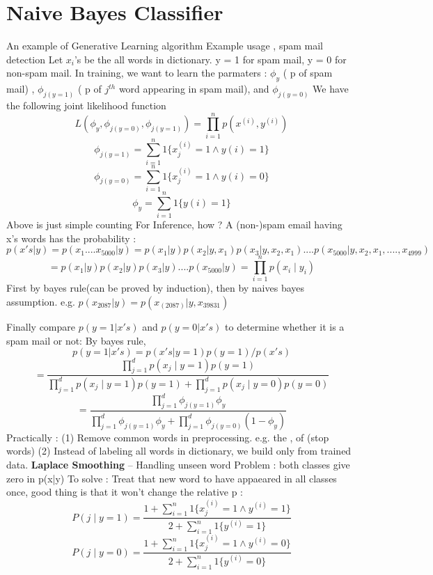 \documentclass{article}
\begin{document}
\section{Naive Bayes Classifier}
An example of Generative Learning algorithm Example usage , spam mail detection\newline
Let \(x_i\)'s be the all words in dictionary. y = 1 for spam mail, y = 0 for non-spam mail. \newline
In training, we want to learn the parmaters : \(\phi_y\) ( p of spam mail) , \(\phi_{j(y=1)}\) ( p of \(j^{th}\) word appearing in spam mail), and \(\phi_{j(y=0)}\) \newline
We have the following joint likelihood function 
\[L(\phi_y, \phi_{j(y=0)}, \phi_{j(y=1)}) = \prod_{i=1}^{n} p(x^{(i)} , y^{(i)})\]
\[
\phi_{j(y=1)} = \sum^{n}_{i=1} 1\{x_j^{(i)} = 1 \wedge y{(i)} = 1 \}
\]
\[
\phi_{j(y=0)} = \sum^{n}_{i=1} 1\{x_j^{(i)} = 1 \wedge y{(i)} = 0 \}
\]
\[
\phi_y = \sum^{n}_{i=1} 1\{ y{(i)} = 1 \}
\]
Above is just simple counting\newline\newline
For Inference, how ?\newline
A (non-)spam email having x's words has the probability :
\[
	p(x's|y) = p(x_1....x_{5000} |  y) = p(x_1|  y)p(x_2|y,x_1)p(x_3|y,x_2,x_1)....p(x_{5000}|y,x_2,x_1,....,x_{4999})
\]
\[
= p(x_1|  y)p(x_2|y)p(x_3|y)....p(x_{5000}|y) = \prod_{i=1}^{n} p(x_i \mid y_i)
\]
First by bayes rule(can be proved by induction), then by naives bayes assumption. e.g. \(p(x_{2087}|y) = p(x_(2087) | y,x_{39831})\) 

Finally compare \(p(y=1|x's)\) and \(p(y=0|x's)\) to determine whether it is a spam mail or not: \newline
By bayes rule, 
\[
	p(y = 1 | x's) = p(x's|y =1)p(y =1) /p(x's)  
\]
\[
= \frac{\prod_{j=1}^{d} p(x_j \mid y=1) p(y=1)}{\prod_{j=1}^{d} p(x_j \mid y=1) p(y=1) + \prod_{j=1}^{d} p(x_j \mid y=0) p(y=0)}
\]
\[
= \frac{\prod_{j=1}^{d} \phi_{j(y=1)} \phi_y}{\prod_{j=1}^{d} \phi_{j(y=1)} \phi_y + \prod_{j=1}^{d} \phi_{j(y=0)} (1-\phi_y)}
\]
Practically : (1) Remove common words in preprocessing. e.g. the , of (stop words) (2) Instead of labeling all words in dictionary, we build only from trained data. \newline\newline
\textbf{Laplace Smoothing} -- Handling unseen word\newline 
Problem :  both classes give zero in p(x|y) \newline
To solve :  Treat that new word to have appaeared in all classes once, good thing is that it won't change the relative p :\newline
\[
P(j \mid y=1) = \frac{1 + \sum_{i=1}^{n} 1\{x_j^{(i)}  = 1 \wedge y^{(i)} = 1\} }{2 + \sum_{i=1}^{n} 1\{ y^{(i)} = 1\} }
\]
\[
P(j \mid y=0) = \frac{1 + \sum_{i=1}^{n} 1\{x_j^{(i)}  = 1 \wedge y^{(i)} = 0\} }{2 + \sum_{i=1}^{n} 1\{ y^{(i)} = 0\} }
\]
\end{document}
